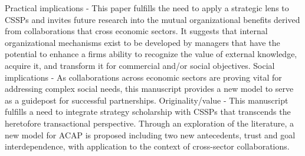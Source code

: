 \documentclass[a4paper]{article}
\begin{document}
Practical implications - This paper fulfills the need to apply a strategic lens to CSSPs and invites future research into the mutual organizational benefits derived from collaborations that cross economic sectors. It suggests that internal organizational mechanisms exist to be developed by managers that have the potential to enhance a firms ability to recognize the value of external knowledge, acquire it, and transform it for commercial and/or social objectives.
Social implications - As collaborations across economic sectors are proving vital for addressing complex social needs, this manuscript provides a new model to serve as a guidepost for successful partnerships.
Originality/value - This manuscript fulfills a need to integrate strategy scholarship with CSSPs that transcends the heretofore transactional perspective. Through an exploration of the literature, a new model for ACAP is proposed including two new antecedents, trust and goal interdependence, with application to the context of cross-sector collaborations.\par
\clearpage
\end{document}
